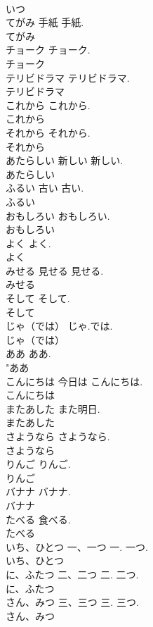 \documentclass[8pt]{extreport}
\begin{document}
\begin{CJK}{UTF8}{min}
\\	いつ
\\	てがみ	手紙	手紙.	
\\	てがみ
\\	チョーク		チョーク.	
\\	チョーク
\\	テリビドラマ		テリビドラマ.	
\\	テリビドラマ
\\	これから		これから.	
\\	これから
\\	それから		それから.	
\\	それから
\\	あたらしい	新しい	新しい.	
\\	あたらしい
\\	ふるい	古い	古い.	
\\	ふるい
\\	おもしろい		おもしろい.	
\\	おもしろい
\\	よく		よく.	
\\	よく
\\	みせる	見せる	見せる.	
\\	みせる
\\	そして		そして.	
\\	そして
\\	じゃ（では）		じゃ.では.	
\\	じゃ（では）
\\	ああ		ああ.	
\\	"ああ
\\	こんにちは	今日は	こんにちは.	
\\	こんにちは
\\	またあした		また明日.	
\\	またあした
\\	さようなら		さようなら.	
\\	さようなら
\\	りんご		りんご.	
\\	りんご
\\	バナナ		バナナ.	
\\	バナナ
\\	たべる		食べる.	
\\	たべる
\\	いち、ひとつ	一、一つ	一. 一つ.	
\\	いち、ひとつ
\\	に、ふたつ	二、二つ	二. 二つ.	
\\	に、ふたつ
\\	さん、みつ	三、三つ	三. 三つ.	
\\	さん、みつ

\end{CJK}
\end{document}

